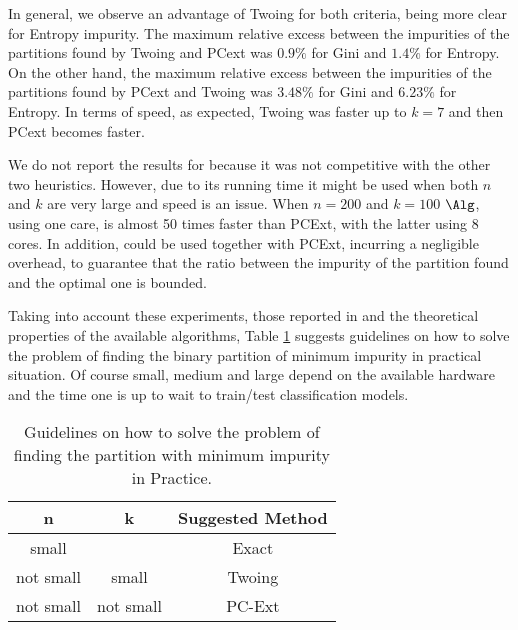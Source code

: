In general, we observe an advantage of Twoing  
for both criteria, being more clear for Entropy impurity.
The maximum relative excess  between the impurities 
of the partitions found by  Twoing and PCext was $0.9\%$ for
Gini and $1.4 \%$ for Entropy.
On the other hand, the 
 maximum relative excess  between the impurities 
of the partitions found by  PCext and Twoing was $3.48 \%$ for
Gini and $6.23 \%$ for Entropy. 
In terms of speed, as expected, Twoing was faster up to $k=7$ and then 
PCext becomes faster.



We do not report the results for \Alg because it was not competitive with the other
two heuristics. However, due to its running time it might be used when both $n$ and $k$ are very large and
speed is an  issue. When $n=200$ and $k=100$ $\Alg$, using one care, is almost 50 times
faster than PCExt, with the latter using  8 cores. In addition,
\Alg could be  used together with  PCExt, incurring a negligible overhead, to guarantee that the ratio 
between the impurity of the partition found and the optimal one is bounded.

 
Taking into account these  experiments, those reported in \cite{journals/datamine/CoppersmithHH99}
and the  theoretical properties of the available algorithms, 
Table  \ref{tab:guidelines}  suggests  guidelines on how to solve the 
problem of finding the binary partition of minimum impurity  in practical situation.
Of course small, medium and large depend on the available
hardware and the time one  is up to wait to train/test classification models. 


\begin{table}[htb]
\centering
\caption{Guidelines on how to solve the problem of finding the partition with minimum impurity 
in Practice.}
\label{tab:guidelines}
\begin{tabular}{c|c|c}
{\bf n} & {\bf k} & {\bf Suggested Method} \\ \hline 
small &  &  Exact \\
not small  & small & Twoing \\
not small  & not small & PC-Ext \\
\end{tabular}
\end{table}




